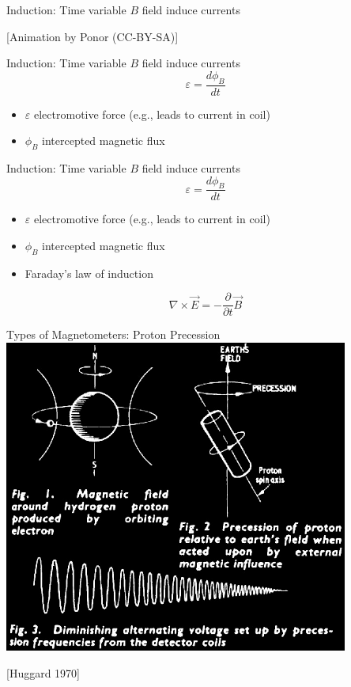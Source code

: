\begin{frame}{Induction: Time variable $B$ field induce currents}
  \centering

  \tiny [Animation by Ponor (CC-BY-SA)]
\end{frame}

\begin{frame}{Induction: Time variable $B$ field induce currents}
  $$
    \varepsilon = \frac{d\phi_B}{dt}
  $$
  \begin{itemize}
    \item $\varepsilon$ electromotive force (e.g., leads to current in coil)
    \item $\phi_B$ intercepted magnetic flux 
  \end{itemize}

\end{frame}

\begin{frame}{Induction: Time variable $B$ field induce currents}
  $$
    \varepsilon = \frac{d\phi_B}{dt}
  $$
  \begin{itemize}
    \item $\varepsilon$ electromotive force (e.g., leads to current in coil)
    \item $\phi_B$ intercepted magnetic flux 
    \item Faraday's law of induction
  \end{itemize}
  $$
    \nabla \times \vec{E} = -\frac{\partial}{\partial t}\vec{B}
  $$

\end{frame}

\begin{frame}
  \begin{PointSix}{Types of Magnetometers: Proton Precession}
    \includegraphics[width=0.85\textwidth]{Figures/Magnetics/ProtonPrecesssion_Huggard1970.jpg}

    \tiny [Huggard 1970]
  \end{PointSix}
\end{frame}

